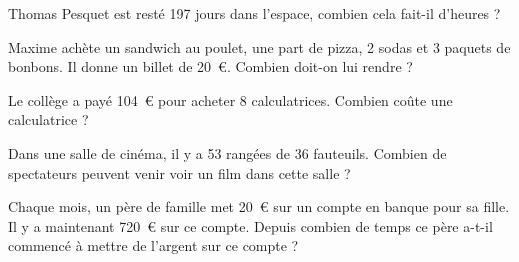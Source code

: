 \exo{}

Thomas Pesquet est resté 197 jours dans l'espace, combien cela fait-il d'heures ?

\exo{}

\hspace{1cm}

\bigskip
Maxime achète un sandwich au poulet, une part de pizza, 2 sodas et 3 paquets de bonbons. Il donne un billet de 20~\euro{}. Combien doit-on lui rendre ?

\exo{}

Le collège a payé 104~\euro{} pour acheter 8 calculatrices. Combien coûte une calculatrice ?

\exo{}

Dans une salle de cinéma, il y a 53 rangées de 36 fauteuils. Combien de spectateurs peuvent venir voir un film dans cette salle ?

\exo{}

Chaque mois, un père de famille met 20~\euro{} sur un compte en banque pour sa fille. Il y a maintenant 720~\euro{} sur ce compte. Depuis combien de temps ce père a-t-il commencé à mettre de l'argent sur ce compte ?